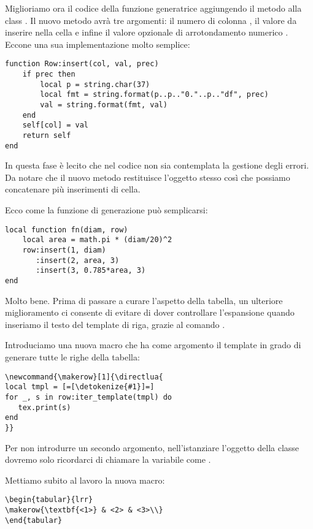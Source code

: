 Miglioriamo ora il codice della funzione generatrice aggiungendo il metodo
 alla class . Il nuovo metodo avrà tre argomenti:
il numero di colonna , il valore da inserire nella cella   e
infine il valore opzionale di arrotondamento numerico . Eccone una sua
implementazione molto semplice:
\begin{Verbatim}
function Row:insert(col, val, prec)
    if prec then
        local p = string.char(37)
        local fmt = string.format(p..p.."0."..p.."df", prec)
        val = string.format(fmt, val)
    end
    self[col] = val
    return self
end
\end{Verbatim}

In questa fase è lecito che nel codice non sia contemplata la gestione degli
errori. Da notare che il nuovo metodo restituisce l'oggetto stesso così che
possiamo concatenare più inserimenti di cella.

Ecco come la funzione di generazione può semplicarsi:
\begin{Verbatim}
local function fn(diam, row)
    local area = math.pi * (diam/20)^2
    row:insert(1, diam)
       :insert(2, area, 3)
       :insert(3, 0.785*area, 3)
end
\end{Verbatim}

Molto bene. Prima di passare a curare l'aspetto della tabella, un ulteriore
miglioramento ci consente di evitare di dover controllare l'espansione quando
inseriamo il testo del template di riga, grazie al comando .

Introduciamo una nuova macro  che ha come argomento il template in
grado di generare tutte le righe della tabella:
\begin{Verbatim}
\newcommand{\makerow}[1]{\directlua{
local tmpl = [=[\detokenize{#1}]=]
for _, s in row:iter_template(tmpl) do
   tex.print(s)
end
}}
\end{Verbatim}

Per non introdurre un secondo argomento, nell'istanziare l'oggetto della classe
 dovremo solo ricordarci di chiamare la variabile come .

Mettiamo subito al lavoro la nuova macro:
\begin{Verbatim}
\begin{tabular}{lrr}
\makerow{\textbf{<1>} & <2> & <3>\\}
\end{tabular}
\end{Verbatim}

